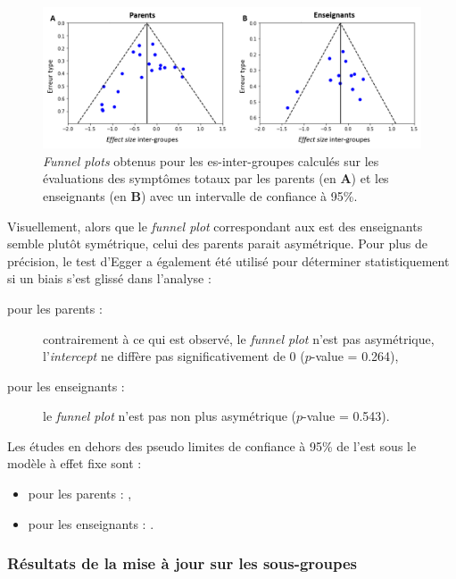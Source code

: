 \begin{figure}[h!]
  \centering
	\includegraphics[width=1\linewidth]{figures/chapter-2/meta-analysis-funnel-plots} 
  \caption[\textit{Funnel plots} de la mise à jour de \citet{Cortese2016}.]{\textit{Funnel plots} obtenus pour les \gls{es}-inter-groupes calculés 
	sur les évaluations des symptômes totaux par les parents (en \textbf{A}) et 
	les enseignants (en \textbf{B}) avec un intervalle de confiance à 95\%.}
  \label{Figure:meta_analysis_funnel_plots}
\end{figure}

Visuellement, alors que le \textit{funnel plot} correspondant aux \gls{est} des enseignants semble plutôt symétrique, celui des parents parait asymétrique. 
Pour plus de précision, le test d'Egger a également été utilisé pour déterminer statistiquement si un biais s'est glissé dans l'analyse \citep{Egger1997} :
\begin{description}
\item[pour les parents :] contrairement à ce qui est observé, le \textit{funnel plot} n'est pas asymétrique, l'\textit{intercept} ne diffère pas 
significativement de 0 ($p$-value = 0.264),
\item[pour les enseignants :]  le \textit{funnel plot} n'est pas non plus asymétrique ($p$-value = 0.543).
\end{description}

Les études en dehors des pseudo limites de confiance à 95\% de l'\gls{est} sous le modèle à effet fixe sont : 
\begin{itemize}
\item pour les parents : \citet{Christiansen2014}, 
\item pour les enseignants : \citet{Moreno2019, Shereena2019}. 
\end{itemize}
 
\subsubsection{Résultats de la mise à jour sur les sous-groupes}
 
